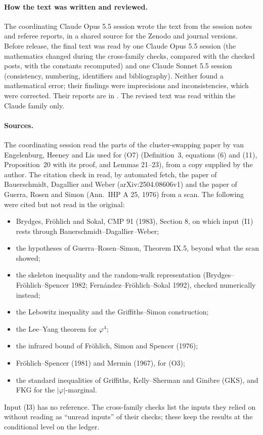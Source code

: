 \documentclass[11pt]{article}
\begin{document}
\paragraph{How the text was written and reviewed.} The coordinating Claude Opus 5.5 session wrote the text from the session notes and referee reports, in a shared source for the Zenodo and journal versions. Before release, the final text was read by one Claude Opus 5.5 session (the mathematics changed during the cross-family checks, compared with the checked posts, with the constants recomputed) and one Claude Sonnet 5.5 session (consistency, numbering, identifiers and bibliography). Neither found a mathematical error; their findings were imprecisions and inconsistencies, which were corrected. Their reports are in . The revised text was read within the Claude family only.

\paragraph{Sources.} The coordinating session read the parts of the cluster-swapping paper by van Engelenburg, Heeney and Lis used for (O7) (Definition~3, equations (6) and (11), Proposition~20 with its proof, and Lemmas 21--23), from a copy supplied by the author. The citation check in  read, by automated fetch, the paper of Bauerschmidt, Dagallier and Weber (arXiv:2504.08606v1) and the paper of Guerra, Rosen and Simon (Ann.\ IHP A 25, 1976) from a scan. The following were cited but not read in the original:
\begin{itemize}
\item Brydges, Fr\"ohlich and Sokal, CMP 91 (1983), Section 8, on which input (I1) rests through Bauerschmidt--Dagallier--Weber;
\item the hypotheses of Guerra--Rosen--Simon, Theorem IX.5, beyond what the scan showed;
\item the skeleton inequality and the random-walk representation (Brydges--Fr\"ohlich--Spencer 1982; Fern\'andez--Fr\"ohlich--Sokal 1992), checked numerically instead;
\item the Lebowitz inequality and the Griffiths--Simon construction;
\item the Lee--Yang theorem for $\varphi^4$;
\item the infrared bound of Fr\"ohlich, Simon and Spencer (1976);
\item Fr\"ohlich--Spencer (1981) and Mermin (1967), for (O3);
\item the standard inequalities of Griffiths, Kelly--Sherman and Ginibre (GKS), and FKG for the $|\varphi|$-marginal.
\end{itemize}
Input (I3) has no reference. The cross-family checks list the inputs they relied on without reading as ``unread inputs'' of their checks; these keep the results at the conditional level on the ledger.
\end{document}
